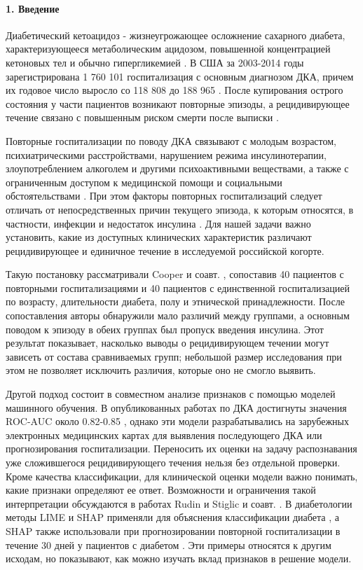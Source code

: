 \documentclass{crm-article}
\begin{document}
\paragraph{1. Введение}\label{sec1}

Диабетический кетоацидоз - жизнеугрожающее осложнение сахарного диабета, характеризующееся метаболическим ацидозом, повышенной концентрацией кетоновых тел и обычно гипергликемией \cite{ref1}. В США за 2003-2014 годы зарегистрирована 1 760 101 госпитализация с основным диагнозом ДКА, причем их годовое число выросло со 118 808 до 188 965 \cite{ref2}. После купирования острого состояния у части пациентов возникают повторные эпизоды, а рецидивирующее течение связано с повышенным риском смерти после выписки \cite{ref3,ref4}.

Повторные госпитализации по поводу ДКА связывают с молодым возрастом, психиатрическими расстройствами, нарушением режима инсулинотерапии, злоупотреблением алкоголем и другими психоактивными веществами, а также с ограниченным доступом к медицинской помощи и социальными обстоятельствами \cite{ref5,ref7}. При этом факторы повторных госпитализаций следует отличать от непосредственных причин текущего эпизода, к которым относятся, в частности, инфекции и недостаток инсулина \cite{ref6}. Для нашей задачи важно установить, какие из доступных клинических характеристик различают рецидивирующее и единичное течение в исследуемой российской когорте.

Такую постановку рассматривали Cooper и соавт. \cite{ref8}, сопоставив 40 пациентов с повторными госпитализациями и 40 пациентов с единственной госпитализацией по возрасту, длительности диабета, полу и этнической принадлежности. После сопоставления авторы обнаружили мало различий между группами, а основным поводом к эпизоду в обеих группах был пропуск введения инсулина. Этот результат показывает, насколько выводы о рецидивирующем течении могут зависеть от состава сравниваемых групп; небольшой размер исследования при этом не позволяет исключить различия, которые оно не смогло выявить.

Другой подход состоит в совместном анализе признаков с помощью моделей машинного обучения. В опубликованных работах по ДКА достигнуты значения ROC-AUC около 0.82-0.85 \cite{ref9,ref10}, однако эти модели разрабатывались на зарубежных электронных медицинских картах для выявления последующего ДКА или прогнозирования госпитализации. Переносить их оценки на задачу распознавания уже сложившегося рецидивирующего течения нельзя без отдельной проверки. Кроме качества классификации, для клинической оценки модели важно понимать, какие признаки определяют ее ответ. Возможности и ограничения такой интерпретации обсуждаются в работах Rudin \cite{ref11} и Stiglic и соавт. \cite{ref12}. В диабетологии методы LIME и SHAP применяли для объяснения классификации диабета \cite{ref13}, а SHAP также использовали при прогнозировании повторной госпитализации в течение 30 дней у пациентов с диабетом \cite{ref14}. Эти примеры относятся к другим исходам, но показывают, как можно изучать вклад признаков в решение модели.
\end{document}
